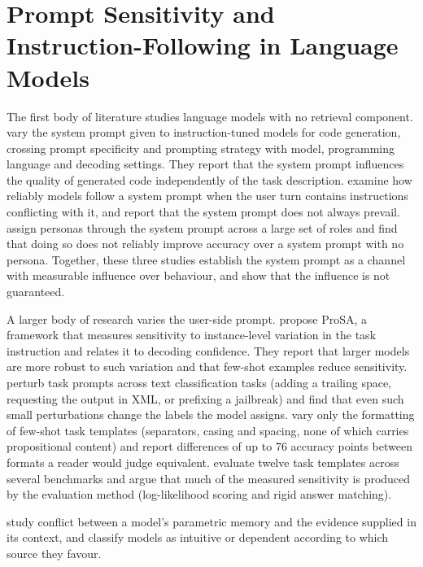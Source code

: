 \documentclass[12pt,a4paper,oneside]{scrreprt}
\begin{document}
\section{Prompt Sensitivity and Instruction-Following in Language Models}
\label{sec:promptlit}

The first body of literature studies language models with no retrieval
component. \citet{cheng2026systemprompts} vary
the system prompt given to instruction-tuned models for code generation, crossing
prompt specificity and prompting strategy with model, programming language and
decoding settings. They report that the system prompt influences the quality of
generated code independently of the task description. \citet{mu2025robustness} examine how reliably models follow a system prompt when the
user turn contains instructions conflicting with it, and report that the system
prompt does not always prevail. \citet{zheng2024helpful} assign personas through the system prompt across a large set of roles and find that doing so does not reliably improve accuracy over a system prompt with no persona. Together, these three studies establish the system prompt as a channel with measurable influence over behaviour, and show that the influence is not guaranteed.

A larger body of research varies the user-side prompt.
\citet{zhuo2024prosa} propose ProSA, a framework that measures sensitivity to instance-level variation in the task instruction and relates it to decoding confidence. They report that larger models are more robust to such variation and that few-shot examples reduce sensitivity.
\citet{salinas2024butterfly} perturb task prompts across text classification
tasks (adding a trailing space, requesting the output in XML, or prefixing a
jailbreak) and find that even such small perturbations change the labels the model
assigns. \citet{sclar2024quantifying} vary only the formatting of few-shot task
templates (separators, casing and spacing, none of which carries propositional
content) and report differences of up to 76 accuracy points between formats a
reader would judge equivalent. \citet{hua2025flaw} evaluate twelve task templates
across several benchmarks and argue that much of the measured sensitivity is
produced by the evaluation method (log-likelihood scoring and rigid answer
matching).

\citet{ying2024intuitive} study conflict
between a model's parametric memory and the evidence supplied in its context, and
classify models as intuitive or dependent according to which source they favour. 
\end{document}
